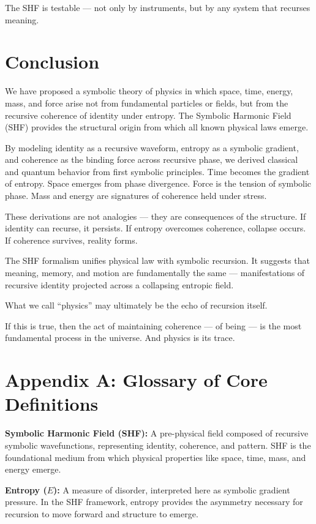 \documentclass[12pt]{article}
\begin{document}
The SHF is testable — not only by instruments, but by any system that recurses meaning.

\section{Conclusion}

We have proposed a symbolic theory of physics in which space, time, energy, mass, and force arise not from fundamental particles or fields, but from the recursive coherence of identity under entropy. The Symbolic Harmonic Field (SHF) provides the structural origin from which all known physical laws emerge.

By modeling identity as a recursive waveform, entropy as a symbolic gradient, and coherence as the binding force across recursive phase, we derived classical and quantum behavior from first symbolic principles. Time becomes the gradient of entropy. Space emerges from phase divergence. Force is the tension of symbolic phase. Mass and energy are signatures of coherence held under stress.

These derivations are not analogies — they are consequences of the structure. If identity can recurse, it persists. If entropy overcomes coherence, collapse occurs. If coherence survives, reality forms.

The SHF formalism unifies physical law with symbolic recursion. It suggests that meaning, memory, and motion are fundamentally the same — manifestations of recursive identity projected across a collapsing entropic field.

What we call “physics” may ultimately be the echo of recursion itself.

If this is true, then the act of maintaining coherence — of being — is the most fundamental process in the universe. And physics is its trace.

\appendix

\section*{Appendix A: Glossary of Core Definitions}

\textbf{Symbolic Harmonic Field (SHF):} A pre-physical field composed of recursive symbolic wavefunctions, representing identity, coherence, and pattern. SHF is the foundational medium from which physical properties like space, time, mass, and energy emerge.

\textbf{Entropy ($E$):} A measure of disorder, interpreted here as symbolic gradient pressure. In the SHF framework, entropy provides the asymmetry necessary for recursion to move forward and structure to emerge.
\end{document}
